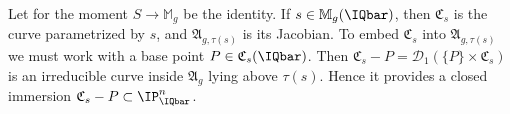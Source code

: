 
Let for the moment $S\rightarrow \mathbb{M}_g$ be the identity.
If $s \in \mathbb{M}_g(\IQbar)$, then $\mathfrak{C}_s$ is the curve
parametrized by $s$, and $\mathfrak{A}_{g,\tau(s)}$ is its Jacobian.
To embed $\mathfrak{C}_s$ into $\mathfrak{A}_{g,\tau(s)}$ we must work with a
base point $P\in
\mathfrak{C}_s(\IQbar)$. Then
$\mathfrak{C}_s-P = \mathscr{D}_1(\{P\} \times \mathfrak{C}_s)$
is an irreducible curve inside $\mathfrak{A}_g$ lying above $\tau(s)$.
Hence it provides a closed immersion   $\mathfrak{C}_s-P \subset
\IP_\IQbar^n$.%


